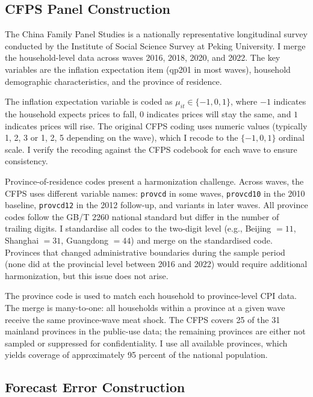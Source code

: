 \subsection{CFPS Panel Construction}

The China Family Panel Studies is a nationally representative
longitudinal survey conducted by the Institute of Social
Science Survey at Peking University.
I merge the household-level data across waves 2016, 2018,
2020, and 2022.
The key variables are the inflation expectation item
(qp201 in most waves), household demographic characteristics,
and the province of residence.

The inflation expectation variable is coded as
$\mu_{it} \in \{-1, 0, 1\}$, where $-1$ indicates the
household expects prices to fall, $0$ indicates prices will
stay the same, and $1$ indicates prices will rise.
The original CFPS coding uses numeric values (typically
1, 2, 3 or 1, 2, 5 depending on the wave), which I recode
to the $\{-1, 0, 1\}$ ordinal scale.
I verify the recoding against the CFPS codebook for each wave
to ensure consistency.

Province-of-residence codes present a harmonization challenge.
Across waves, the CFPS uses different variable names:
\texttt{provcd} in some waves, \texttt{provcd10} in the 2010
baseline, \texttt{provcd12} in the 2012 follow-up, and
variants in later waves.
All province codes follow the GB/T 2260 national standard but
differ in the number of trailing digits.
I standardise all codes to the two-digit level (e.g., Beijing
$= 11$, Shanghai $= 31$, Guangdong $= 44$) and merge on the
standardised code.
Provinces that changed administrative boundaries during the
sample period (none did at the provincial level between 2016
and 2022) would require additional harmonization, but this
issue does not arise.

The province code is used to match each household to
province-level CPI data.
The merge is many-to-one: all households within a province
at a given wave receive the same province-wave meat shock.
The CFPS covers 25 of the 31 mainland provinces in the public-use
data; the remaining provinces are either not sampled or
suppressed for confidentiality.
I use all available provinces, which yields coverage of
approximately 95 percent of the national population.

\subsection{Forecast Error Construction}

